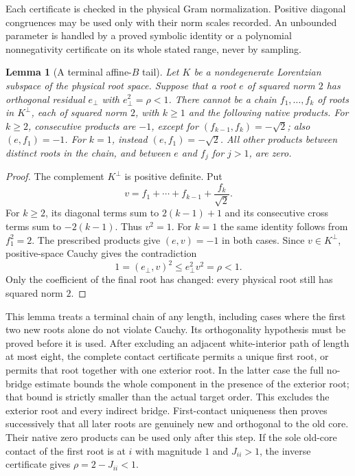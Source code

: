 \documentclass[11pt]{article}
\newtheorem{lemma}[theorem]{Lemma}
\theoremstyle{remark}\newtheorem{remark}[theorem]{Remark}
\begin{document}
Each certificate is checked in the physical Gram normalization.
Positive diagonal congruences may be used only with their norm
scales recorded. An unbounded parameter is handled by a proved
symbolic identity or a polynomial nonnegativity certificate on its
whole stated range, never by sampling.

\begin{lemma}[A terminal affine-$B$ tail]
\label{lem:terminal-b-tail}
Let $K$ be a nondegenerate Lorentzian subspace of the physical root space.
Suppose that a root $e$ of squared norm $2$ has orthogonal residual
$e_\perp$ with $e_\perp^2=\rho<1$. There cannot be a chain
$f_1,\ldots,f_k$ of roots in $K^\perp$, each of squared norm $2$,
with $k\ge1$ and the following native products. For $k\ge2$, consecutive products
are $-1$, except for $(f_{k-1},f_k)=-\sqrt2$; also
$(e,f_1)=-1$. For $k=1$, instead $(e,f_1)=-\sqrt2$.
All other products between distinct roots in the chain, and between
$e$ and $f_j$ for $j>1$, are zero.
\end{lemma}

\begin{proof}
The complement $K^\perp$ is positive definite. Put
\[
 v=f_1+\cdots+f_{k-1}+\frac{f_k}{\sqrt2}.
\]
For $k\ge2$, its diagonal terms sum to $2(k-1)+1$ and its
consecutive cross terms sum to $-2(k-1)$. Thus $v^2=1$.
For $k=1$ the same identity follows from $f_1^2=2$.
The prescribed products give $(e,v)=-1$ in both cases.
Since $v\in K^\perp$, positive-space Cauchy gives the contradiction
\[
 1=(e_\perp,v)^2\le e_\perp^2v^2=\rho<1.
\]
Only the coefficient of the final root has changed: every physical
root still has squared norm $2$.
\end{proof}

This lemma treats a terminal chain of any length, including cases where
the first two new roots alone do not violate Cauchy. Its orthogonality
hypothesis must be proved before it is used. After excluding an adjacent
white-interior path of length at most eight, the complete contact
certificate permits a unique first root, or permits
that root together with one exterior root. In the latter case the
full no-bridge estimate bounds the whole component in the presence of
the exterior root; that bound is strictly smaller than the actual target
order. This excludes the exterior root and every indirect bridge.
First-contact uniqueness then proves successively that all later roots
are genuinely new and orthogonal to the old core. Their native zero
products can be used only after this step. If the sole old-core contact of the first root
is at $i$ with magnitude $1$ and $J_{ii}>1$, the inverse certificate gives
$\rho=2-J_{ii}<1$.
\end{document}
